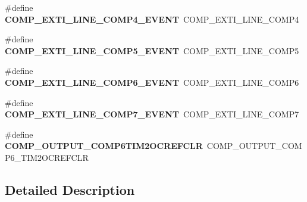 \begin{DoxyCompactItemize}
\item 
\mbox{\label{group___h_a_l___c_o_m_p___aliased___defines_ga7e682dbcdc2deedaa2b2854b7256b742}} 
\#define {\bfseries C\+O\+M\+P\+\_\+\+E\+X\+T\+I\+\_\+\+L\+I\+N\+E\+\_\+\+C\+O\+M\+P4\+\_\+\+E\+V\+E\+NT}~C\+O\+M\+P\+\_\+\+E\+X\+T\+I\+\_\+\+L\+I\+N\+E\+\_\+\+C\+O\+M\+P4
\item 
\mbox{\label{group___h_a_l___c_o_m_p___aliased___defines_gad0def6714ebe83bd131d6f62f12bf6b7}} 
\#define {\bfseries C\+O\+M\+P\+\_\+\+E\+X\+T\+I\+\_\+\+L\+I\+N\+E\+\_\+\+C\+O\+M\+P5\+\_\+\+E\+V\+E\+NT}~C\+O\+M\+P\+\_\+\+E\+X\+T\+I\+\_\+\+L\+I\+N\+E\+\_\+\+C\+O\+M\+P5
\item 
\mbox{\label{group___h_a_l___c_o_m_p___aliased___defines_ga92c1033ac0c380c9f879660af7c62616}} 
\#define {\bfseries C\+O\+M\+P\+\_\+\+E\+X\+T\+I\+\_\+\+L\+I\+N\+E\+\_\+\+C\+O\+M\+P6\+\_\+\+E\+V\+E\+NT}~C\+O\+M\+P\+\_\+\+E\+X\+T\+I\+\_\+\+L\+I\+N\+E\+\_\+\+C\+O\+M\+P6
\item 
\mbox{\label{group___h_a_l___c_o_m_p___aliased___defines_ga7f18b1fe252971b1976e906c2c7d4be7}} 
\#define {\bfseries C\+O\+M\+P\+\_\+\+E\+X\+T\+I\+\_\+\+L\+I\+N\+E\+\_\+\+C\+O\+M\+P7\+\_\+\+E\+V\+E\+NT}~C\+O\+M\+P\+\_\+\+E\+X\+T\+I\+\_\+\+L\+I\+N\+E\+\_\+\+C\+O\+M\+P7
\item 
\mbox{\label{group___h_a_l___c_o_m_p___aliased___defines_ga74dbd1a72efdaee104678a256383976f}} 
\#define {\bfseries C\+O\+M\+P\+\_\+\+O\+U\+T\+P\+U\+T\+\_\+\+C\+O\+M\+P6\+T\+I\+M2\+O\+C\+R\+E\+F\+C\+LR}~C\+O\+M\+P\+\_\+\+O\+U\+T\+P\+U\+T\+\_\+\+C\+O\+M\+P6\+\_\+\+T\+I\+M2\+O\+C\+R\+E\+F\+C\+LR
\end{DoxyCompactItemize}


\subsection{Detailed Description}
